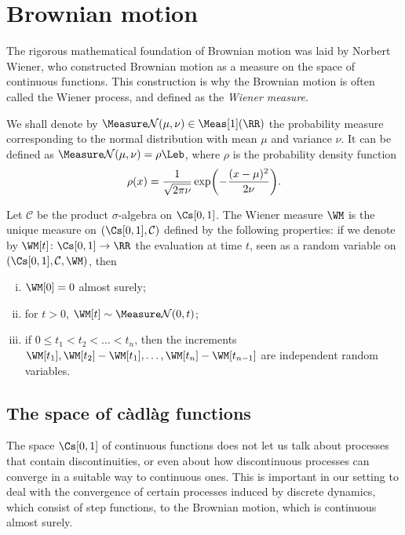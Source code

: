 \documentclass[../main]{subfiles}
\begin{document}

\section{Brownian motion}\label{sec:brownian-motion}

The rigorous mathematical foundation of Brownian motion was laid by Norbert Wiener, who constructed Brownian motion as a measure on the space of continuous functions. This construction is why the Brownian motion is often called the Wiener process, and defined as the \emph{Wiener measure}.

We shall denote by \(\Normal[\mu][\nu] \in \Meas[1](\RR)\) the probability measure corresponding to the normal distribution with mean \(\mu\) and variance \(\nu\). It can be defined as \(\Normal[\mu][\nu] = \rho \Leb\), where \(\rho\) is the probability density function
\begin{equation*}
  \rho(x) = \frac{1}{\sqrt{2\pi \nu}}\exp\rpar*{-\frac{(x - \mu)^2}{2\nu}}.
\end{equation*}

\begin{definition}
  Let \(\mathcal{C}\) be the product \(\sigma\)-algebra on \(\CWPS\). The Wiener measure \(\WM\) is the unique measure on \((\CWPS, \mathcal{C})\) defined by the following properties: if we denote by \(\WM[t] \colon \CWPS \to \RR\) the evaluation at time \(t\), seen as a random variable on \((\CWPS, \mathcal{C}, \WM)\), then
  \begin{enumerate}[(i)]
  \item \(\WM[0] = 0\) almost surely;
  \item for \(t > 0\), \(\WM[t] \sim \Normal[0][t]\);
  \item if \(0 \leq t_1 < t_2 < \dots < t_n\), then the increments \(\WM[t_1], \WM[t_2] - \WM[t_1], \dots, \WM[t_n] - \WM[t_{n - 1}]\) are independent random variables.
  \end{enumerate}
\end{definition}

\subsection{The space of càdlàg functions}\label{sec:space-cadl-funct}

The space \(\CWPS\) of continuous functions does not let us talk about processes that contain discontinuities, or even about how discontinuous processes can converge in a suitable way to continuous ones. This is important in our setting to deal with the convergence of certain processes induced by discrete dynamics, which consist of step functions, to the Brownian motion, which is continuous almost surely.
\end{document}
